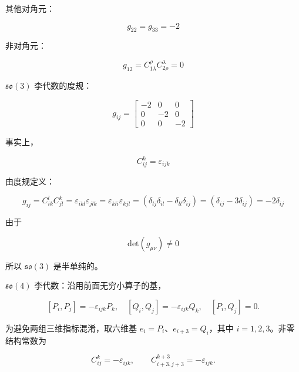 其他对角元：

\begin{equation}
g_{22}=g_{33}=-2
\end{equation}

非对角元：

\begin{equation}
g_{12}
=C_{1\lambda}^\rho C_{2\rho}^\lambda
=0
\end{equation}

$\mathfrak{so}\left(3\right)$ 李代数的度规：

\begin{equation}
g_{ij}
=\begin{bmatrix}
-2 &0 &0 \\
0 &-2 &0 \\
0 &0 &-2
\end{bmatrix}
\end{equation}

事实上，

\begin{equation}
C_{ij}^k
=\varepsilon_{ijk}
\end{equation}

由度规定义：

\begin{equation}
g_{ij}
=C_{ik}^l C_{jl}^k
=\varepsilon_{ikl}\varepsilon_{jlk}
=\varepsilon_{kli}\varepsilon_{kjl}
=\left(\delta_{lj}\delta_{il}-\delta_{ll}\delta_{ij} \right)
=\left(\delta_{ij}-3\delta_{ij} \right)
=-2\delta_{ij}
\end{equation}

由于

\begin{equation}
\mathrm{det}\left(g_{\mu\nu} \right)\ne 0
\end{equation}

所以 $\mathfrak{so}\left(3\right)$ 是半单纯的。

$\mathfrak{so}\left(4\right)$ 李代数：沿用前面无穷小算子的基，

\begin{equation}
\left[P_i,P_j\right]=-\varepsilon_{ijk}P_k,\quad
\left[Q_i,Q_j\right]=-\varepsilon_{ijk}Q_k,\quad \left[P_i,Q_j\right]=0.
\end{equation}

为避免两组三维指标混淆，取六维基 $e_i=P_i$、$e_{i+3}=Q_i$，其中 $i=1,2,3$。非零结构常数为

\begin{equation}
C_{ij}^{k}=-\varepsilon_{ijk},\qquad
C_{i+3,j+3}^{k+3}=-\varepsilon_{ijk}.
\end{equation}

